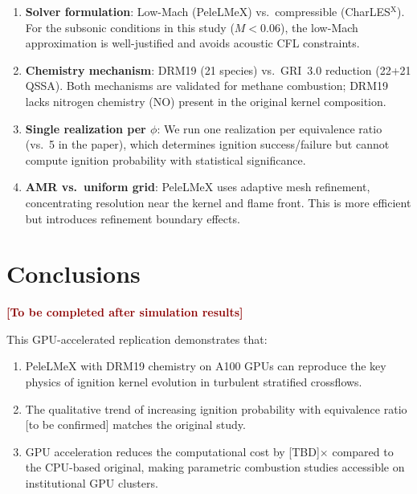 \documentclass[11pt]{article}
\begin{document}
\begin{enumerate}[leftmargin=*]
    \item \textbf{Solver formulation}: Low-Mach (PeleLMeX) vs.\ compressible (CharLES$^{\mathrm{X}}$). For the subsonic conditions in this study ($M < 0.06$), the low-Mach approximation is well-justified and avoids acoustic CFL constraints.
    
    \item \textbf{Chemistry mechanism}: DRM19 (21 species) vs.\ GRI~3.0 reduction (22+21 QSSA). Both mechanisms are validated for methane combustion; DRM19 lacks nitrogen chemistry (NO) present in the original kernel composition.
    
    \item \textbf{Single realization per $\phi$}: We run one realization per equivalence ratio (vs.\ 5 in the paper), which determines ignition success/failure but cannot compute ignition probability with statistical significance.
    
    \item \textbf{AMR vs.\ uniform grid}: PeleLMeX uses adaptive mesh refinement, concentrating resolution near the kernel and flame front. This is more efficient but introduces refinement boundary effects.
\end{enumerate}

\section{Conclusions}

\textcolor{darkred}{\textbf{[To be completed after simulation results]}}

This GPU-accelerated replication demonstrates that:
\begin{enumerate}
    \item PeleLMeX with DRM19 chemistry on A100 GPUs can reproduce the key physics of ignition kernel evolution in turbulent stratified crossflows.
    \item The qualitative trend of increasing ignition probability with equivalence ratio [to be confirmed] matches the original study.
    \item GPU acceleration reduces the computational cost by [TBD]$\times$ compared to the CPU-based original, making parametric combustion studies accessible on institutional GPU clusters.
\end{enumerate}
\end{document}
